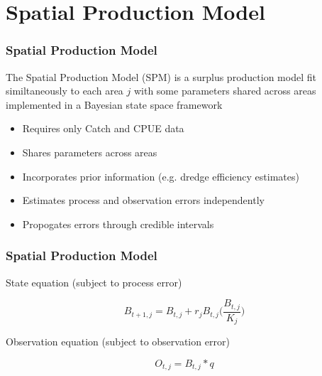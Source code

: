 \documentclass{beamer}
\begin{document}
%
%

\section{Spatial Production Model}

\begin{frame}
\frametitle{Spatial Production Model}
The Spatial Production Model (SPM) is a surplus production model fit similtaneously to each area $j$ with some parameters shared across areas implemented in a Bayesian state space framework

\begin{itemize}
    \item Requires only Catch and CPUE data
    \item Shares parameters across areas
    \item Incorporates prior information (e.g. dredge efficiency estimates)
    \item Estimates process and observation errors independently
    \item Propogates errors through credible intervals
\end{itemize}


\end{frame}



\begin{frame}
\frametitle{Spatial Production Model}
State equation (subject to process error)

\begin{equation*}
    B_{t+1,j} = B_{t,j} + r_jB_{t,j} \biggl(\frac{B_{t,j}}{K_j} \biggr)
\end{equation*}

Observation equation (subject to observation error)


\begin{equation*}
    O_{t,j} = B_{t,j} * q
\end{equation*}


\end{frame}
\end{document}

